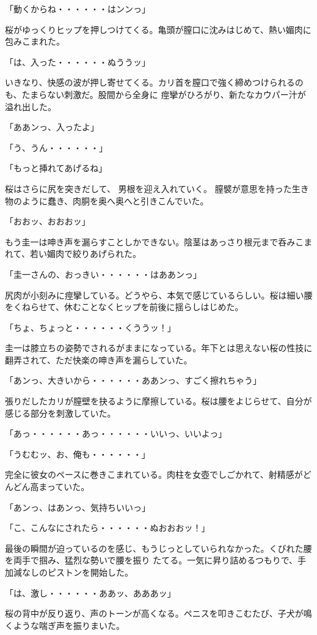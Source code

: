 ﻿\documentclass[book,tate]{jlreq}
\begin{document}
「動くからね・・・・・・はンンっ」

桜がゆっくりヒップを押しつけてくる。亀頭が膣口に沈みはじめて、熱い媚肉に包みこまれた。

「は、入った・・・・・・ぬううッ」

いきなり、快感の波が押し寄せてくる。カリ首を膣口で強く締めつけられるのも、たまらない刺激だ。股間から全身に 痙攣がひろがり、新たなカウパー汁が溢れ出した。

「ああンっ、入ったよ」

「う、うん・・・・・・」

「もっと挿れてあげるね」

桜はさらに尻を突きだして、 男根を迎え入れていく。 膣襞が意思を持った生き物のように蠢き、肉胴を奥へ奥へと引きこんでいた。

「おおッ、おおおッ」

もう圭一は呻き声を漏らすことしかできない。陰茎はあっさり根元まで呑みこまれて、若い媚肉で絞りあげられた。

「圭一さんの、おっきい・・・・・・はああンっ」

尻肉が小刻みに痙攣している。どうやら、本気で感じているらしい。桜は細い腰をくねらせて、休むことなくヒップを前後に揺らしはじめた。

「ちょ、ちょっと・・・・・・くううッ！」

圭一は膝立ちの姿勢でされるがままになっている。年下とは思えない桜の性技に翻弄されて、ただ快楽の呻き声を漏らしていた。

「あンっ、大きいから・・・・・・ああンっ、すごく擦れちゃう」

張りだしたカリが膣壁を抉るように摩擦している。桜は腰をよじらせて、自分が感じる部分を刺激していた。

「あっ・・・・・・あっ・・・・・・いいっ、いいよっ」

「うむむッ、お、俺も・・・・・・」

完全に彼女のペースに巻きこまれている。肉柱を女壺でしごかれて、射精感がどんどん高まっていた。

「あンっ、はあンっ、気持ちいいっ」

「こ、こんなにされたら・・・・・・ぬおおおッ！」

最後の瞬間が迫っているのを感じ、もうじっとしていられなかった。くびれた腰を両手で掴み、猛烈な勢いで腰を振り たてる。一気に昇り詰めるつもりで、手加減なしのピストンを開始した。

「は、激し・・・・・・ああッ、あああッ」

桜の背中が反り返り、声のトーンが高くなる。ペニスを叩きこむたび、子犬が鳴くような喘ぎ声を振りまいた。
\end{document}
